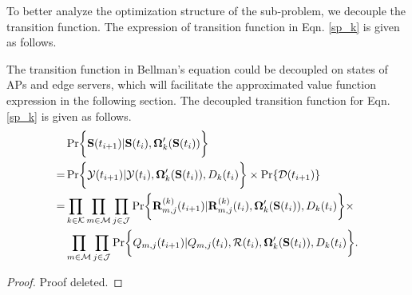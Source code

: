 To better analyze the optimization structure of the sub-problem, we decouple the transition function. The expression of transition function in Eqn. \ref{sp_k} is given as follows.
\begin{lemma}
    The transition function in Bellman's equation could be decoupled on states of APs and edge servers, which will facilitate the approximated value function expression in the following section.
    The decoupled transition function for Eqn. \ref{sp_k} is given as follows.
    \begin{align}
        & \Pr\Brace{ \Stat(t_{i+1})|\Stat(t_{i}), \Policy'_{k}(\Stat(t_{i})) }
        \nonumber\\
        =& \Pr\Brace{ \Obsv(t_{i+1})|\Obsv(t_{i}), \Policy'_{k}(\Stat(t_{i})), D_{k}(t_{i}) } \times \Pr\{\mathcal{D}(t_{i+1})\}
        \nonumber\\
        =& \prod_{k\in\apSet}\prod_{m\in\esSet}\prod_{j\in\jSpace}
                \Pr\Brace{
                    \vec{R}^{(k)}_{m,j}(t_{i+1}) | \vec{R}^{(k)}_{m,j}(t_{i}),
                    \Policy'_{k}(\Stat(t_{i})), D_{k}(t_{i})
                }
                \times  
            \nonumber\\
            & \prod_{m\in\esSet}\prod_{j\in\jSpace}
                \Pr\Brace{
                    Q_{m,j}(t_{i+1})|Q_{m,j}(t_{i}), \mathcal{R}(t_{i}), \Policy'_{k}(\Stat(t_{i})), D_{k}(t_{i})
                }.
    \end{align}
\end{lemma}
\begin{proof}
    Proof deleted.
\end{proof}

